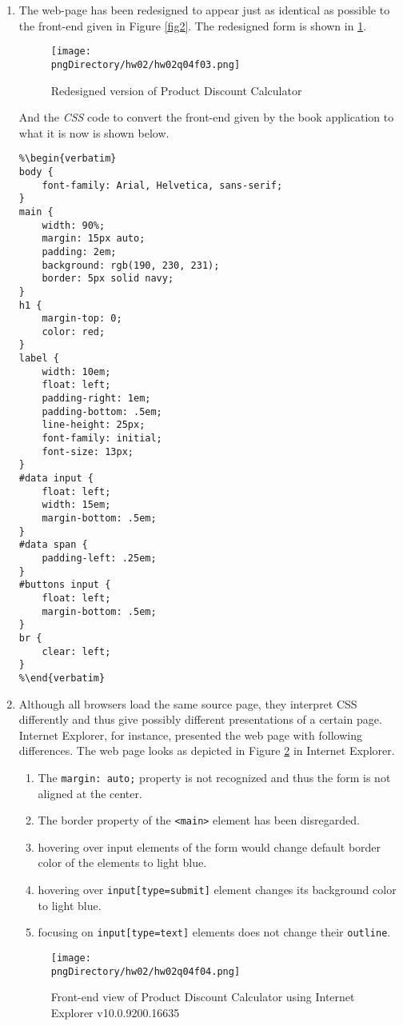 \begin{enumerate}[label=(\alph*)]
\item The web-page has been redesigned to appear just as identical as possible to the front-end given in Figure \ref{fig2}. The redesigned form is shown in \ref{fig3}.

\begin{figure}\centering
\texttt{[image: \\pngDirectory/hw02/hw02q04f03.png]}
\caption{Redesigned version of Product Discount Calculator}
\label{fig3}
\end{figure}

And the \textit{CSS} code to convert the front-end given by the book application to what it is now is shown below.

\begin{lstlisting}
%\begin{verbatim}
body {
    font-family: Arial, Helvetica, sans-serif;
}
main {
    width: 90%;
    margin: 15px auto;
    padding: 2em;
    background: rgb(190, 230, 231);
    border: 5px solid navy;
}
h1 {
    margin-top: 0;
    color: red;
}
label {
    width: 10em;
    float: left;
    padding-right: 1em;
    padding-bottom: .5em;
    line-height: 25px;
    font-family: initial;
    font-size: 13px;
}
#data input {
    float: left;
    width: 15em;
    margin-bottom: .5em;
}
#data span {
    padding-left: .25em;
}
#buttons input {
    float: left;
    margin-bottom: .5em;
}
br {
    clear: left;
}
%\end{verbatim}
\end{lstlisting}

\item Although all browsers load the same source page, they interpret CSS differently and thus give possibly different presentations of a certain page. Internet Explorer, for instance, presented the web page with following differences. The web page looks as depicted in Figure \ref{fig4} in Internet Explorer.

\begin{enumerate}[label=\arabic*.]
\item The \texttt{margin: auto;} property is not recognized and thus the form is not aligned at the center.
\item The border property of the \texttt{<main>} element has been disregarded.
\item hovering over input elements of the form would change default border color of the elements to light blue.
\item hovering over \texttt{input[type=submit]} element changes its background color to light blue.
\item focusing on \texttt{input[type=text]} elements does not change their \texttt{outline}.
\end{enumerate}

\begin{figure}[H]\centering
\texttt{[image: \\pngDirectory/hw02/hw02q04f04.png]}
\caption{Front-end view of Product Discount Calculator using Internet Explorer v10.0.9200.16635}\label{fig4}
\end{figure}

\end{enumerate}
